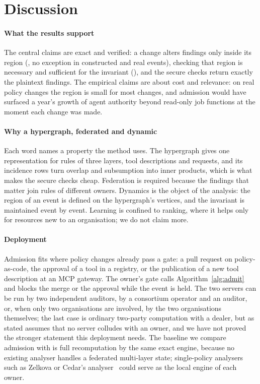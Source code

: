\section{Discussion}\label{sec:discussion}

\paragraph{What the results support} The central claims are exact and verified: a change alters findings only inside its region (, no exception in \eOneEvents{} constructed and \awsEvents{} real events), checking that region is necessary and sufficient for the invariant (), and the secure checks return exactly the plaintext findings. The empirical claims are about cost and relevance: on real policy changes the region is small for most changes, and admission would have surfaced a year's growth of agent authority beyond read-only job functions at the moment each change was made.

\paragraph{Why a hypergraph, federated and dynamic} Each word names a property the method uses. The hypergraph gives one representation for rules of three layers, tool descriptions and requests, and its incidence rows turn overlap and subsumption into inner products, which is what makes the secure checks cheap. Federation is required because the findings that matter join rules of different owners. Dynamics is the object of the analysis: the region of an event is defined on the hypergraph's vertices, and the invariant is maintained event by event. Learning is confined to ranking, where it helps only for resources new to an organisation; we do not claim more.

\paragraph{Deployment} Admission fits where policy changes already pass a gate: a pull request on policy-as-code, the approval of a tool in a registry, or the publication of a new tool description at an MCP gateway. The owner's gate calls Algorithm~\ref{alg:admit} and blocks the merge or the approval while the event is held. The two servers can be run by two independent auditors, by a consortium operator and an auditor, or, when only two organisations are involved, by the two organisations themselves; the last case is ordinary two-party computation with a dealer, but  as stated assumes that no server colludes with an owner, and we have not proved the stronger statement this deployment needs. The baseline we compare admission with is full recomputation by the same exact engine, because no existing analyser handles a federated multi-layer state; single-policy analysers such as Zelkova or Cedar's analyser~\cite{backes2018zelkova,cutler2024cedar} could serve as the local engine of each owner.

